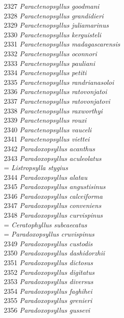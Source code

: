 \documentclass[
]{article}
\begin{document}
2327 \emph{Paractenopsyllus goodmani}\\
2328 \emph{Paractenopsyllus grandidieri}\\
2329 \emph{Paractenopsyllus juliamarinus}\\
2330 \emph{Paractenopsyllus kerguisteli}\\
2331 \emph{Paractenopsyllus madagascarensis}\\
2332 \emph{Paractenopsyllus oconnori}\\
2333 \emph{Paractenopsyllus pauliani}\\
2334 \emph{Paractenopsyllus petiti}\\
2335 \emph{Paractenopsyllus randrianasoloi}\\
2336 \emph{Paractenopsyllus ratovonjatoi}\\
2337 \emph{Paractenopsyllus ratovonjatovi}\\
2338 \emph{Paractenopsyllus raxworthyi}\\
2339 \emph{Paractenopsyllus rouxi}\\
2340 \emph{Paractenopsyllus vauceli}\\
2341 \emph{Paractenopsyllus viettei}\\
2342 \emph{Paradoxopsyllus acanthus}\\
2343 \emph{Paradoxopsyllus aculeolatus}\\
= \emph{Listropsylla stygius}\\
2344 \emph{Paradoxopsyllus alatau}\\
2345 \emph{Paradoxopsyllus angustisinus}\\
2346 \emph{Paradoxopsyllus calceiforma}\\
2347 \emph{Paradoxopsyllus conveniens}\\
2348 \emph{Paradoxopsyllus curvispinus}\\
= \emph{Ceratophyllus subcaecatus}\\
= \emph{Paradoxopsyllus cruvispinus}\\
2349 \emph{Paradoxopsyllus custodis}\\
2350 \emph{Paradoxopsyllus dashidorzhii}\\
2351 \emph{Paradoxopsyllus dictosus}\\
2352 \emph{Paradoxopsyllus digitatus}\\
2353 \emph{Paradoxopsyllus diversus}\\
2354 \emph{Paradoxopsyllus faghihei}\\
2355 \emph{Paradoxopsyllus grenieri}\\
2356 \emph{Paradoxopsyllus gussevi}\\
\end{document}
